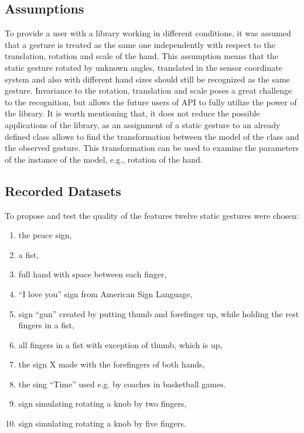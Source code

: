 \subsection{Assumptions}\label{staticAssumptions}
To provide a user with a library working in different conditions, it was assumed that a gesture is treated as the same one independently with respect to the translation, rotation and scale of the hand. 
This assumption means that the static gesture rotated by unknown angles, translated in the sensor coordinate system and also with different hand sizes should still be recognized as the same gesture.
Invariance to the rotation, translation and scale poses a great challenge to the recognition, but allows the future users of API to fully utilize the power of the library.
It is worth mentioning that, it does not reduce the possible applications of the library, as an assignment of a static gesture to an already defined class allows to find the transformation between the model of the class and the observed gesture.
This transformation can be used to examine the parameters of the instance of the model, e.g., rotation of the hand.

\subsection{Recorded Datasets}

To propose and test the quality of the features twelve static gestures were chosen:
\begin{enumerate}
\item the peace sign,
\item a fist,
\item full hand with space between each finger,
\item ``I love you'' sign from American Sign Language,
\item sign ``gun'' created by putting thumb and forefinger up, while holding the rest fingers in a fist,
\item all fingers in a fist with exception of thumb, which is up,
\item the sign X made with the forefingers of both hands,
\item the sing ``Time'' used e.g. by coaches in basketball games.
\item sign simulating rotating a knob by two fingers,
\item sign simulating rotating a knob by five fingers.
\end{enumerate} 

